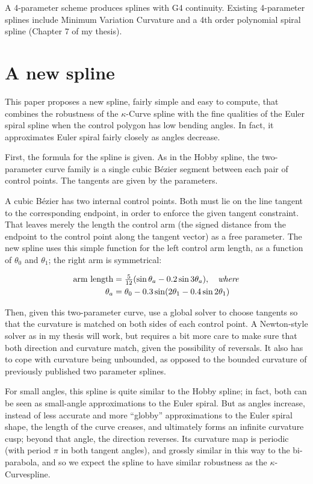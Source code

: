 \documentclass{article}
\newcommand{\kcurve}{$\kappa$-Curve}
\begin{document}
A 4-parameter scheme produces splines with G4 continuity. Existing 4-parameter splines include Minimum Variation Curvature \cite{Moreton92} and a 4th order polynomial spiral spline (Chapter 7 of my thesis).

\section{A new spline}

This paper proposes a new spline, fairly simple and easy to compute, that combines the robustness of the \kcurve{} spline with the fine qualities of the Euler spiral spline when the control polygon has low bending angles. In fact, it approximates Euler spiral fairly closely as angles decrease.

First, the formula for the spline is given. As in the Hobby spline, the two-parameter curve family is a single cubic B{\'ezier} segment between each pair of control points. The tangents are given by the parameters.

A cubic B{\'e}zier has two internal control points. Both must lie on the line tangent to the corresponding endpoint, in order to enforce the given tangent constraint. That leaves merely the length the control arm (the signed distance from the endpoint to the control point along the tangent vector) as a free parameter. The new spline uses this simple function for the left control arm length, as a function of $\theta_0$ and $\theta_1$; the right arm is symmetrical:

\[
\begin{aligned}
\mbox{arm length} & = \tfrac{5}{12}(\sin \theta_a - 0.2\sin 3\theta_a), \quad \mbox{\emph{where}} \\
\theta_a & = \theta_0 - 0.3 \sin (2\theta_1 - 0.4\sin 2\theta_1) \\
\end{aligned}
\]

Then, given this two-parameter curve, use a global solver to choose tangents so that the curvature is matched on both sides of each control point. A Newton-style solver as in my thesis will work, but requires a bit more care to make sure that both direction and curvature match, given the possibility of reversals. It also has to cope with curvature being unbounded, as opposed to the bounded curvature of previously published two parameter splines.

For small angles, this spline is quite similar to the Hobby spline; in fact, both can be seen as small-angle approximations to the Euler spiral. But as angles increase, instead of less accurate and more ``globby'' approximations to the Euler spiral shape, the length of the curve creases, and ultimately forms an infinite curvature cusp; beyond that angle, the direction reverses. Its curvature map is periodic (with period $\pi$ in both tangent angles), and grossly similar in this way to the bi-parabola, and so we expect the spline to have similar robustness as the \kcurve spline.
\end{document}
